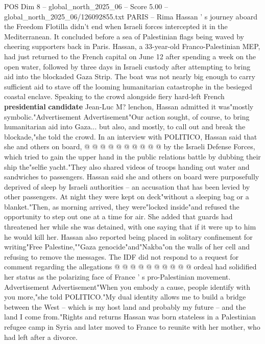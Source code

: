 \begin{textsample}{POS Dim 8 – global\_north\_2025\_06 – Score 5.00 – global\_north\_2025\_06/126092855.txt}  \label{ex:f8_pos_438}
PARIS -- Rima Hassan ' s journey aboard the Freedom Flotilla didn't end when Israeli forces intercepted it in the Mediterranean.
It concluded before a sea of Palestinian flags being waved by cheering supporters back in Paris.
Hassan, a 33-year-old Franco-Palestinian MEP, had just returned to the French capital on June 12 after spending a week on the open water, followed by three days in Israeli custody after attempting to bring aid into the blockaded Gaza Strip.
The boat was not nearly big enough to carry sufficient aid to stave off the looming humanitarian catastrophe in the besieged coastal enclave.
Speaking to the crowd alongside fiery hard-left French \textbf{presidential} \textbf{candidate} Jean-Luc M? lenchon, Hassan admitted it was"mostly symbolic."Advertisement Advertisement"Our action sought, of course, to bring humanitarian aid into Gaza... but also, and mostly, to call out and break the blockade,"she told the crowd.
In an interview with POLITICO, Hassan said that she and others on board, @ @ @ @ @ @ @ @ @ @ by the Israeli Defense Forces, which tried to gain the upper hand in the public relations battle by dubbing their ship the"selfie yacht."They also shared videos of troops handing out water and sandwiches to passengers.
Hassan said she and others on board were purposefully deprived of sleep by Israeli authorities -- an accusation that has been levied by other passengers.
At night they were kept on deck"without a sleeping bag or a blanket."Then, as morning arrived, they were"locked inside"and refused the opportunity to step out one at a time for air.
She added that guards had threatened her while she was detained, with one saying that if it were up to him he would kill her.
Hassan also reported being placed in solitary confinement for writing"Free Palestine,""Gaza genocide"and"Nakba"on the walls of her cell and refusing to remove the messages.
The IDF did not respond to a request for comment regarding the allegations @ @ @ @ @ @ @ @ @ @ ordeal had solidified her status as the polarizing face of France ' s pro-Palestinian movement.
Advertisement Advertisement"When you embody a cause, people identify with you more,"she told POLITICO."My dual identity allows me to build a bridge between the West -- which is my host land and probably my future -- and the land I come from."Rights and returns Hassan was born stateless in a Palestinian refugee camp in Syria and later moved to France to reunite with her mother, who had left after a divorce.

\end{textsample}
